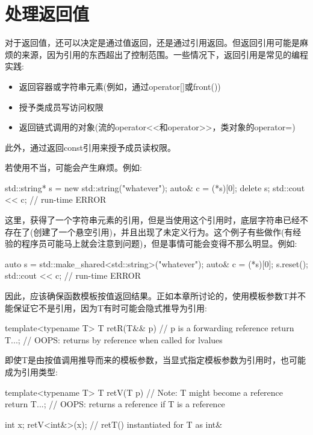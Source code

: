 \section{处理返回值}


对于返回值，还可以决定是通过值返回，还是通过引用返回。但返回引用可能是麻烦的来源，因为引用的东西超出了控制范围。一些情况下，返回引用是常见的编程实践:

\begin{itemize}
\item 
返回容器或字符串元素(例如，通过operator[]或front())

\item 
授予类成员写访问权限

\item 
返回链式调用的对象(流的operator<{}<和operator>{}>，类对象的operator=)
\end{itemize}

此外，通过返回const引用来授予成员读权限。

若使用不当，可能会产生麻烦。例如:

\begin{cpp}
std::string* s = new std::string("whatever");
auto& c = (*s)[0];
delete s;
std::cout << c; // run-time ERROR
\end{cpp}

这里，获得了一个字符串元素的引用，但是当使用这个引用时，底层字符串已经不存在了(创建了一个悬空引用)，并且出现了未定义行为。这个例子有些做作(有经验的程序员可能马上就会注意到问题)，但是事情可能会变得不那么明显。例如:

\begin{cpp}
auto s = std::make_shared<std::string>("whatever");
auto& c = (*s)[0];
s.reset();
std::cout << c; // run-time ERROR
\end{cpp}

因此，应该确保函数模板按值返回结果。正如本章所讨论的，使用模板参数T并不能保证它不是引用，因为T有时可能会隐式推导为引用:

\begin{cpp}
template<typename T>
T retR(T&& p) // p is a forwarding reference
{
	return T{...}; // OOPS: returns by reference when called for lvalues
}
\end{cpp}

即使T是由按值调用推导而来的模板参数，当显式指定模板参数为引用时，也可能成为引用类型:

\begin{cpp}
template<typename T>
T retV(T p) // Note: T might become a reference
{
	return T{...}; // OOPS: returns a reference if T is a reference
}

int x;
retV<int&>(x); // retT() instantiated for T as int&
\end{cpp}

